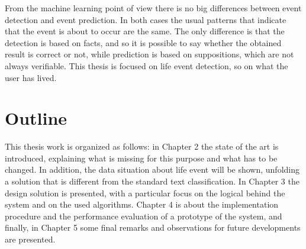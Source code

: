 From the machine learning point of view there is no big differences between event detection and event prediction. In both cases the usual patterns that indicate that the event is about to occur are the same. The only difference is that the detection is based on facts, and so it is possible to say whether the obtained result is correct or not, while prediction is based on suppositions, which are not always verifiable. This thesis is focused on life event detection, so on what the user has lived.

\section{Outline}

This thesis work is organized as follows: in Chapter 2 the state of the art is introduced, explaining what is missing for this purpose and what has to be changed. In addition, the data situation about life event will be shown, unfolding a solution that is different from the standard text classification. In Chapter 3 the design solution is presented, with a particular focus on the logical behind the system and on the used algorithms. Chapter 4 is about the implementation procedure and the performance evaluation of a prototype of the system, and finally, in Chapter 5 some final remarks and observations for future developments are presented.

